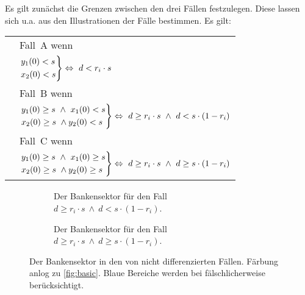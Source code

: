 Es gilt zunächst die Grenzen zwischen den drei Fällen festzulegen. Diese lassen sich u.a. aus den Illustrationen der Fälle bestimmen. Es gilt:

\begin{tabularx}{\textwidth}{ll}
	 & Fall~A wenn  \\
	            & \hspace{1cm} $\begin{rcases}
	                                y_1(0) < s \\
	                                x_2(0) < s
	                            \end{rcases}
	                            \Leftrightarrow \ d < r_i \cdot s$\\
	 & Fall~B wenn  \\
	            & \hspace{1cm} $\begin{rcases}
	                                y_1(0) \geq s \ \wedge \ x_1(0) < s \\
	                                x_2(0) \geq s \ \wedge y_2(0) < s
	                            \end{rcases}
	                            \Leftrightarrow \ d \geq r_i \cdot s \ \wedge \ d < s \cdot (1-r_i)$\\
	 & Fall~C wenn  \\
	            & \hspace{1cm} $\begin{rcases}
	                                y_1(0) \geq s \ \wedge \ x_1(0) \geq s \\
	                                x_2(0) \geq s \ \wedge y_2(0) \geq s
	                            \end{rcases}
	                            \Leftrightarrow \ d \geq r_i \cdot s \ \wedge \ d \geq s \cdot (1-r_i)$
\end{tabularx}

\begin{figure}[p]
	\centering
	\begin{subfigure}[b]{\textwidth}\centering
		\caption{Der Bankensektor für den Fall $d \geq r_i \cdot s \ \wedge \ d < s \cdot (1-r_i)$.}%
		\label{fig:error:1}\vspace{4mm}
	\end{subfigure}
	\hfill
	\begin{subfigure}[b]{\textwidth}\centering
		\caption{Der Bankensektor für den Fall $d \geq r_i \cdot s \ \wedge \ d \geq s \cdot (1-r_i)$.}%
		\label{fig:error:2}
	\end{subfigure}
	\caption[Der Bankensektor in den von \citeauthor{Wagner-2010} nicht differenzierten Fällen.]{Der Bankensektor in den von \citeauthor{Wagner-2010} nicht differenzierten Fällen. Färbung anlog zu \cref{fig:basic}. Blaue Bereiche werden bei \citeauthor{Wagner-2010} fälschlicherweise berücksichtigt.}%
	\label{fig:error}
\end{figure}

